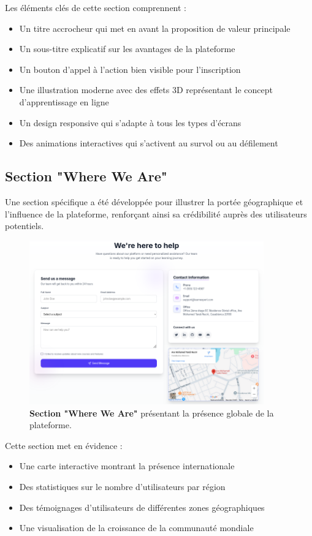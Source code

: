 Les éléments clés de cette section comprennent :
\begin{itemize}
  \item Un titre accrocheur qui met en avant la proposition de valeur principale
  \item Un sous-titre explicatif sur les avantages de la plateforme
  \item Un bouton d'appel à l'action bien visible pour l'inscription
  \item Une illustration moderne avec des effets 3D représentant le concept d'apprentissage en ligne
  \item Un design responsive qui s'adapte à tous les types d'écrans
  \item Des animations interactives qui s'activent au survol ou au défilement
\end{itemize}

\subsection{Section "Where We Are"}
Une section spécifique a été développée pour illustrer la portée géographique et l'influence de la plateforme, renforçant ainsi sa crédibilité auprès des utilisateurs potentiels.

\begin{figure}[h!]
  \centering
  \includegraphics[width=0.9\textwidth,keepaspectratio]{week_2_img/where_we_are_section.png}
  \caption{\textbf{Section "Where We Are"} présentant la présence globale de la plateforme.}
  \label{fig:where_we_are}
\end{figure}

Cette section met en évidence :
\begin{itemize}
  \item Une carte interactive montrant la présence internationale
  \item Des statistiques sur le nombre d'utilisateurs par région
  \item Des témoignages d'utilisateurs de différentes zones géographiques
  \item Une visualisation de la croissance de la communauté mondiale
\end{itemize}

